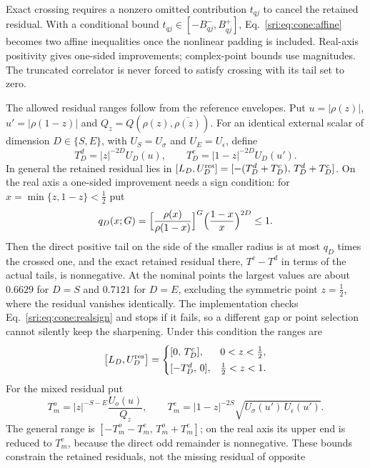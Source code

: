 Exact crossing requires a nonzero omitted contribution $t_{qj}$ to cancel the retained residual. With a conditional
bound $t_{qj}\in[-B^-_{qj},B^+_{qj}]$, Eq.~\eqref{sri:eq:cone:affine} becomes two affine inequalities once the nonlinear
padding is included. Real-axis positivity gives one-sided improvements; complex-point bounds use magnitudes. The
truncated correlator is never forced to satisfy crossing with its tail set to zero.

The allowed residual ranges follow from the reference envelopes. Put $u=|\rho(z)|$, $u'=|\rho(1-z)|$ and
$Q_z=Q(\rho(z),\overline{\rho(z)})$. For an identical external scalar of dimension $D\in\{S,E\}$, with $U_S=U_\sigma$
and $U_E=U_\epsilon$, define
\begin{equation}
 T_D^d=|z|^{-2D}U_D(u),\qquad T_D^c=|1-z|^{-2D}U_D(u').
\end{equation}
In general the retained residual lies in $[L_D,U^{\rm res}_D]=[-(T_D^d+T_D^c),\,T_D^d+T_D^c]$. On the real axis a one-sided improvement
needs a sign condition: for $x=\min\{z,1-z\}<\frac12$ put
\begin{equation}
 q_D(x;G)=\Bigl[\frac{\rho(x)}{\rho(1-x)}\Bigr]^G\Bigl(\frac{1-x}{x}\Bigr)^{2D}\le1 .
 \label{sri:eq:cone:realsign}
\end{equation}
Then the direct positive tail on the side of the smaller radius is at most $q_D$ times the crossed one, and the exact
retained residual there, $T^c-T^d$ in terms of the actual tails, is nonnegative. At the nominal points the largest
values are about $0.6629$ for $D=S$ and $0.7121$ for $D=E$, excluding the symmetric point $z=\frac12$, where the residual
vanishes identically. The implementation checks Eq.~\eqref{sri:eq:cone:realsign} and stops if it fails, so a different gap
or point selection cannot silently keep the sharpening. Under this condition the ranges are
\begin{equation}
 \bigl[L_D,U^{\rm res}_D\bigr]=\begin{cases}[0,\,T_D^c],&0<z<\frac12,\\[2pt] [-T_D^d,\,0],&\frac12<z<1.\end{cases}
\end{equation}
For the mixed residual put
\begin{equation}
 T_m^o=|z|^{-S-E}\frac{U_o(u)}{Q_z},\qquad T_m^e=|1-z|^{-2S}\sqrt{U_\sigma(u')\,U_\epsilon(u')} .
\end{equation}
The general range is $[-T_m^o-T_m^e,\,T_m^o+T_m^e]$; on the real axis its upper end is reduced to $T_m^e$, because the
direct odd remainder is nonnegative. These bounds constrain the retained residuals, not the missing residual of opposite
